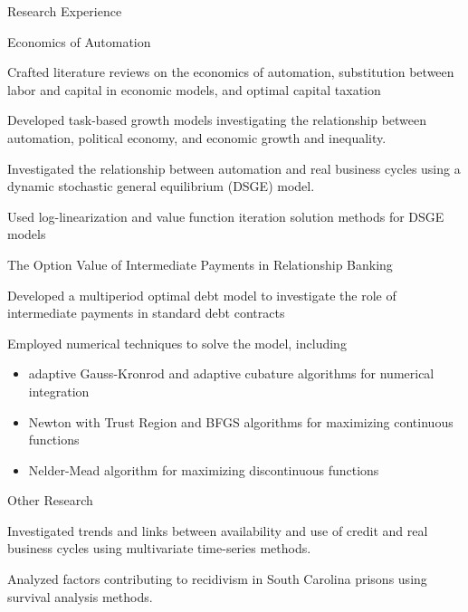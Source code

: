 \documentclass{resume} %
\begin{document}
\begin{rSection}{Research Experience}
    \begin{rSubsection}{Economics of Automation}{}{}{}
        \item Crafted literature reviews on the economics of automation, substitution between labor and capital in economic models, and optimal capital taxation
        \item Developed task-based growth models investigating the relationship between automation, political economy, and economic growth and inequality.
        \item Investigated the relationship between automation and real business cycles using a dynamic stochastic general equilibrium (DSGE) model.
        \item Used log-linearization and value function iteration solution methods for DSGE models
    \end{rSubsection}

    \begin{rSubsection}{The Option Value of Intermediate Payments in Relationship Banking}{}{}{}
        \item Developed a multiperiod optimal debt model to investigate the role of intermediate payments in standard debt contracts
        \item Employed numerical techniques to solve the model, including 
        \begin{itemize}
            \item adaptive Gauss-Kronrod and adaptive cubature algorithms for numerical integration
            \item Newton with Trust Region and BFGS algorithms for maximizing continuous functions
            \item Nelder-Mead algorithm for maximizing discontinuous functions
        \end{itemize}
    \end{rSubsection}

    \begin{rSubsection}{Other Research}{}{}{}
        \item Investigated trends and links between availability and use of credit and real business cycles using multivariate time-series methods.
        \item Analyzed factors contributing to recidivism in South Carolina prisons using survival analysis methods.
    \end{rSubsection}
\end{rSection}
\end{document}
